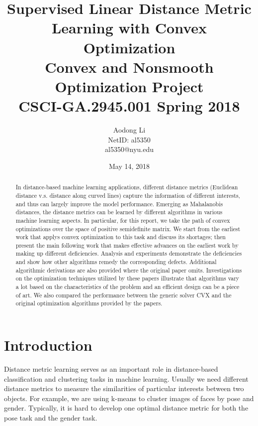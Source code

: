\documentclass[12pt]{article}
\begin{document}
\title{Supervised Linear Distance Metric Learning with Convex Optimization \\ Convex and Nonsmooth Optimization Project\\CSCI-GA.2945.001 Spring 2018}
\author{Aodong Li\\NetID: al5350\\al5350@nyu.edu}
\date{May 14, 2018}
\maketitle

\begin{abstract}
In distance-based machine learning applications, different distance metrics (Euclidean distance v.s. distance along curved lines) capture the information of different interests, and thus can largely improve the model performance. Emerging as Mahalanobis distances, the distance metrics can be learned by different algorithms in various machine learning aspects. In particular, for this report, we take the path of convex optimizations over the space of positive semidefinite matrix. We start from the earliest work that applys convex optimization to this task and discuss its shortages; then present the main following work that makes effective advances on the earliest work by making up different deficiencies. Analysis and experiments demonstrate the deficiencies and show how other algorithms remedy the corresponding defects. Additional algorithmic derivations are also provided where the original paper omits. 
Investigations on the optimization techniques utilized by these papers illustrate that algorithms vary a lot based on the characteristics of the problem and an efficient design can be a piece of art.
We also compared the performance between the generic solver CVX and the original optimization algorithms provided by the papers.
\end{abstract}

\section{Introduction}
Distance metric learning serves as an important role in distance-based classification and clustering tasks in machine learning. Usually we need different distance metrics to measure the similarities of particular interests between two objects. For example, we are using k-means to cluster images of faces by pose and gender. Typically, it is hard to develop one optimal distance metric for both the pose task and the gender task.%
\end{document}
